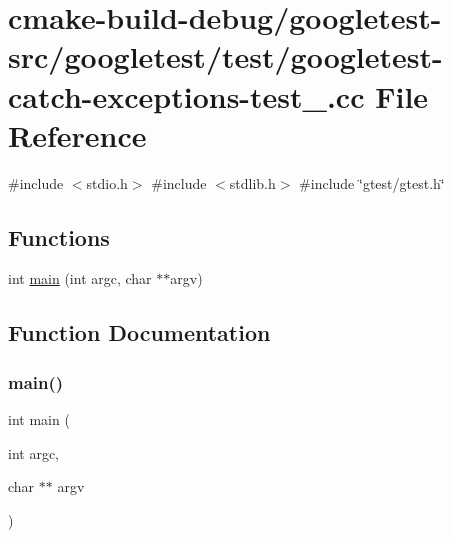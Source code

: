 \hypertarget{googletest-catch-exceptions-test___8cc}{}\section{cmake-\/build-\/debug/googletest-\/src/googletest/test/googletest-\/catch-\/exceptions-\/test\+\_\+.cc File Reference}
\label{googletest-catch-exceptions-test___8cc}
{\ttfamily \#include $<$stdio.\+h$>$}\newline
{\ttfamily \#include $<$stdlib.\+h$>$}\newline
{\ttfamily \#include \char`\"{}gtest/gtest.\+h\char`\"{}}\newline
\subsection*{Functions}
\begin{DoxyCompactItemize}
\item 
int \mbox{\hyperlink{googletest-catch-exceptions-test___8cc_a3c04138a5bfe5d72780bb7e82a18e627}{main}} (int argc, char $\ast$$\ast$argv)
\end{DoxyCompactItemize}


\subsection{Function Documentation}
\mbox{\label{googletest-catch-exceptions-test___8cc_a3c04138a5bfe5d72780bb7e82a18e627}} 
\subsubsection{\texorpdfstring{main()}{main()}}
{\footnotesize\ttfamily int main (\begin{DoxyParamCaption}\item[{int}]{argc,  }\item[{char $\ast$$\ast$}]{argv }\end{DoxyParamCaption})}

